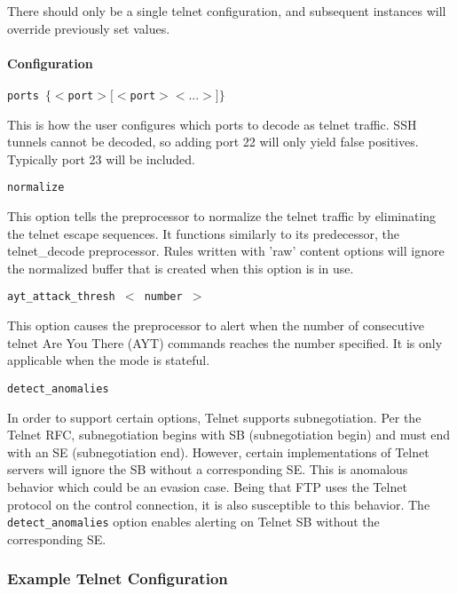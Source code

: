 \documentclass[english]{report}
\newcounter{slistnum}
\newenvironment{slist}
{ \begin{list}{ {\bf \arabic{slistnum}.} }{\usecounter{slistnum} } }
{ \end{list} }
\begin{document}
There should  only be a single telnet configuration, and subsequent instances
will override previously set values.

\paragraph{Configuration}
\begin{slist}
\item \texttt{ports $\{ <$port$> [<$port$> <...>] \}$}

This is how the user configures which ports to decode as telnet traffic.  SSH
tunnels cannot be decoded, so adding port 22 will only yield false positives.
Typically port 23 will be included.

\item \texttt{normalize}

This option tells the preprocessor to normalize the telnet traffic by
eliminating the telnet escape sequences.  It functions similarly to its
predecessor, the telnet\_decode preprocessor.  Rules written with 'raw' content
options will ignore the normalized buffer that is created when this option is
in use.

\item \texttt{ayt\_attack\_thresh $<$ number $>$}

This option causes the preprocessor to alert when the number of consecutive
telnet Are You There (AYT) commands reaches the number specified.  It is only
applicable when the mode is stateful.

\item \texttt{detect\_anomalies}

In order to support certain options, Telnet supports subnegotiation. Per the
Telnet RFC, subnegotiation begins with SB (subnegotiation begin) and must end
with an SE (subnegotiation end). However, certain implementations of Telnet
servers will ignore the SB without a corresponding SE. This is anomalous
behavior which could be an evasion case. Being that FTP uses the Telnet
protocol on the control connection, it is also susceptible to this behavior.
The \texttt{detect\_anomalies} option enables alerting on Telnet SB without the
corresponding SE.

\end{slist}

\subsubsection{Example Telnet Configuration}
\end{document}
